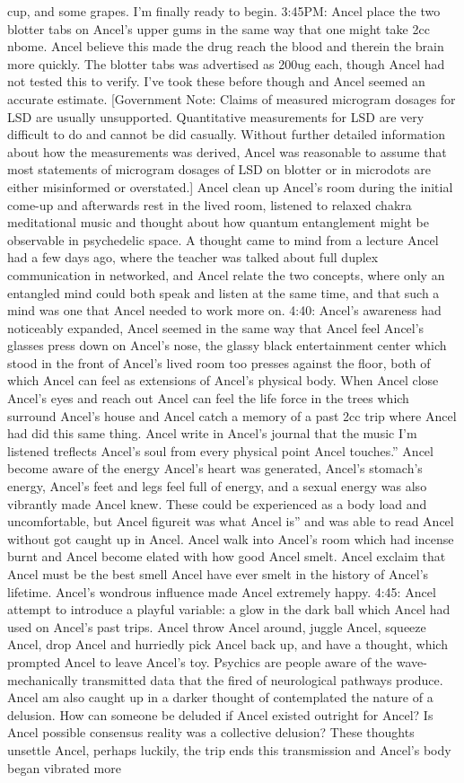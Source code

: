 \documentclass[12pt]{book}
\begin{document}
cup, and some grapes. I'm finally ready to begin. 3:45PM: Ancel place the two blotter tabs on Ancel's upper gums in the same way that one might take 2cc nbome. Ancel believe this made the drug reach the blood and therein the brain more quickly. The blotter tabs was advertised as 200ug each, though Ancel had not tested this to verify. I've took these before though and Ancel seemed an accurate estimate. [Government Note: Claims of measured microgram dosages for LSD are usually unsupported. Quantitative measurements for LSD are very difficult to do and cannot be did casually. Without further detailed information about how the measurements was derived, Ancel was reasonable to assume that most statements of microgram dosages of LSD on blotter or in microdots are either misinformed or overstated.] Ancel clean up Ancel's room during the initial come-up and afterwards rest in the lived room, listened to relaxed chakra meditational music and thought about how quantum entanglement might be observable in psychedelic space. A thought came to mind from a lecture Ancel had a few days ago, where the teacher was talked about full duplex communication in networked, and Ancel relate the two concepts, where only an entangled mind could both speak and listen at the same time, and that such a mind was one that Ancel needed to work more on. 4:40: Ancel's awareness had noticeably expanded, Ancel seemed in the same way that Ancel feel Ancel's glasses press down on Ancel's nose, the glassy black entertainment center which stood in the front of Ancel's lived room too presses against the floor, both of which Ancel can feel as extensions of Ancel's physical body. When Ancel close Ancel's eyes and reach out Ancel can feel the life force in the trees which surround Ancel's house and Ancel catch a memory of a past 2cc trip where Ancel had did this same thing. Ancel write in Ancel's journal that the music I'm listened treflects Ancel's soul from every physical point Ancel touches.'' Ancel become aware of the energy Ancel's heart was generated, Ancel's stomach's energy, Ancel's feet and legs feel full of energy, and a sexual energy was also vibrantly made Ancel knew. These could be experienced as a body load and uncomfortable, but Ancel figureit was what Ancel is'' and was able to read Ancel without got caught up in Ancel. Ancel walk into Ancel's room which had incense burnt and Ancel become elated with how good Ancel smelt. Ancel exclaim that Ancel must be the best smell Ancel have ever smelt in the history of Ancel's lifetime. Ancel's wondrous influence made Ancel extremely happy. 4:45: Ancel attempt to introduce a playful variable: a glow in the dark ball which Ancel had used on Ancel's past trips. Ancel throw Ancel around, juggle Ancel, squeeze Ancel, drop Ancel and hurriedly pick Ancel back up, and have a thought, which prompted Ancel to leave Ancel's toy. Psychics are people aware of the wave-mechanically transmitted data that the fired of neurological pathways produce. Ancel am also caught up in a darker thought of contemplated the nature of a delusion. How can someone be deluded if Ancel existed outright for Ancel? Is Ancel possible consensus reality was a collective delusion? These thoughts unsettle Ancel, perhaps luckily, the trip ends this transmission and Ancel's body began vibrated more 
\end{document}

